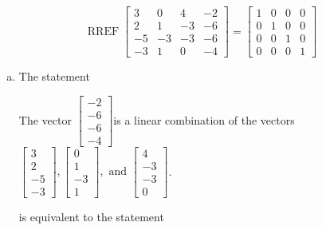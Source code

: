 \begin{exerciseAnswer} 
\[\operatorname{RREF}  \left[\begin{array}{ccc|c}
3 & 0 & 4 & -2 \\
2 & 1 & -3 & -6 \\
-5 & -3 & -3 & -6 \\
-3 & 1 & 0 & -4
\end{array}\right] = \left[\begin{array}{ccc|c}
1 & 0 & 0 & 0 \\
0 & 1 & 0 & 0 \\
0 & 0 & 1 & 0 \\
0 & 0 & 0 & 1
\end{array}\right] \]
\begin{enumerate}[(a)]
\item  The statement 
\begin{center}\begin{minipage}{0.8\textwidth}
 The vector \( \left[\begin{array}{c}
-2 \\
-6 \\
-6 \\
-4
\end{array}\right] \)is a linear combination of the vectors \( \left[\begin{array}{c}
3 \\
2 \\
-5 \\
-3
\end{array}\right] , \left[\begin{array}{c}
0 \\
1 \\
-3 \\
1
\end{array}\right] , \text{ and } \left[\begin{array}{c}
4 \\
-3 \\
-3 \\
0
\end{array}\right] \). 
\end{minipage}\end{center}
     is equivalent to the statement 
\begin{center}\begin{minipage}{0.8\textwidth}
 The vector equation \( x_{1} \left[\begin{array}{c}
3 \\
2 \\
-5 \\
-3

\end{array}
\end{minipage}
\end{center}
\end{enumerate}
\end{exerciseAnswer}
